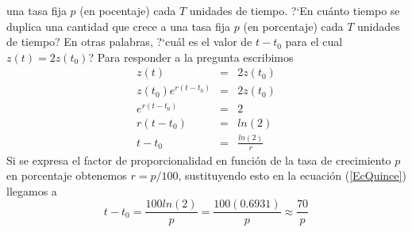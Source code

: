 \documentclass[12pt]{article}
\begin{document}
una tasa fija $p$ (en pocentaje) cada $T$ unidades de tiempo. ?`En cu\'{a}nto tiempo se duplica una 
cantidad que crece a una tasa fija $p$ (en porcentaje) cada $T$ unidades de tiempo? En otras palabras, 
?`cu\'{a}l es el valor de $t-t_{0}$ para el cual $z(t)=2z(t_{0})$?
Para responder a la pregunta escribimos
\begin{eqnarray}
z(t)&=&2z(t_{0})\\
z(t_{0})e^{r(t-t_{0})}&=&2z(t_{0})\\
e^{r(t-t_{0})}&=&2\\
r(t-t_{0})&=&ln(2)\\
t-t_{0}&=&\frac{ln(2)}{r}\label{EcQuince}
\end{eqnarray}
Si se expresa el factor de proporcionalidad en funci\'{o}n de la tasa de crecimiento $p$ en porcentaje 
obtenemos $r=p/100$, sustituyendo esto en la ecuaci\'{o}n (\ref{EcQuince}) llegamos a
\begin{equation}
t-t_{0}=\frac{100ln(2)}{p}=\frac{100(0.6931)}{p}\approx\frac{70}{p}
\end{equation}
\end{document}
